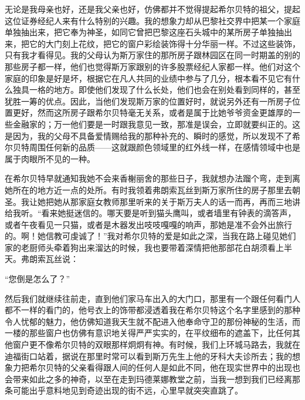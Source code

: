 \par 无论是我母亲也好，还是我父亲也好，仿佛都并不觉得提起希尔贝特的祖父，提起这位证券经纪人来有什么特别的兴趣。我的想象力却从巴黎社交界中把某一个家庭单独抽出来，把它奉为神圣，如同它曾把巴黎这座石头城中的某所房子单独抽出来，把它的大门刻上花纹，把它的窗户彩绘装饰得十分华丽一样。不过这些装饰，只有我才看得见。我的父母认为斯万家住的那所房子跟林园区在同一时期盖的别的那些房子都一样，他们也觉得斯万家跟别的许多股票经纪人家都一样。他们对这个家庭的印象是好是坏，根据它在凡人共同的业绩中参与了几分，根本看不见它有什么独具一格的地方。即使他们发现了什么长处，他们也会在别处看到同样的，甚至犹胜一筹的优点。因此，当他们发现斯万家的位置好时，就说另外还有一所房子位置更好，然而这所房子跟希尔贝特毫无关系，或者是属于比她爷爷资金更雄厚的一些金融家的；万一他们要是一时跟我意见一致，那准是误会，立即就要纠正的。这是因为，我的父母不具备爱情赐给我的那种补充的、瞬时的感觉，所以发现不了希尔贝特周围任何新的品质——这就跟颜色领域里的红外线一样，在感情领域中也是属于肉眼所不见的一种。
\par 在希尔贝特早就通知我她不会来香榭丽舍的那些日子，我就想办法蹓个弯，走到离她所在的地方近一点的处所。有时我领着弗朗索瓦丝到斯万家所住的房子那里去朝圣。我让她把她从那家庭女教师那里听来的关于斯万夫人的话一而再，再而三地讲给我听。“看来她挺迷信的。哪天要是听到猫头鹰叫，或者墙里有钟表的滴答声，或者午夜看见一只猫，或者是木器发出吱吱嘎嘎的响声，那她是准不会外出旅行的。啊！她信教可虔诚了！”我对希尔贝特的爱是如此之深，当我在路上碰见她们家的老厨师头牵着狗出来溜达的时候，我也要带着深情把他那部花白胡须看上半天。弗朗索瓦丝说：
\par “您倒是怎么了？”
\par 然后我们就继续往前走，直到他们家马车出入的大门口，那里有一个跟任何看门人都不一样的看门的，他号衣上的饰带都浸透着我在希尔贝特这个名字里感到的那种令人忧郁的魅力，他仿佛知道我天生就不配进入他奉命守卫的那份神秘的生活，而一楼的那些窗户也仿佛有意识地关得严严实实的，在平纹细布的遮盖下，比任何其他窗户更不像希尔贝特的双眼那样炯炯有神。有时候，我们上环城马路去，我就在迪福街口站着，据说在那里时常可以看到斯万先生上他的牙科大夫诊所去；我的想象力把希尔贝特的父亲看得跟人间的任何人是如此不同，他在现实世界中的出现也会带来如此之多的神奇，以至在走到玛德莱娜教堂之前，当我一想到我们已经离那条可能出乎意料地见到奇迹出现的街不远，心里早就突突直跳了。

